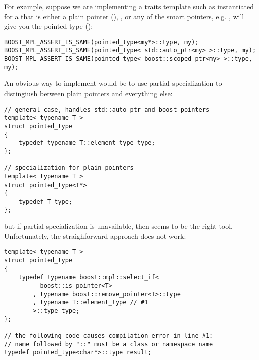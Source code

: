 \documentclass{netobjectdays}
\begin{document}

For example, suppose we are implementing a 
traits template such as  instantiated
for a  that is either a plain pointer
(), , or any of the 
smart pointers, e.g. , will give you 
the pointed type ():

{\footnotesize
\begin{verbatim}
BOOST_MPL_ASSERT_IS_SAME(pointed_type<my*>::type, my);
BOOST_MPL_ASSERT_IS_SAME(pointed_type< std::auto_ptr<my> >::type, my);
BOOST_MPL_ASSERT_IS_SAME(pointed_type< boost::scoped_ptr<my> >::type, my);
\end{verbatim}
}

An obvious way to implement  would be to 
use partial specialization to distingiush between plain 
pointers and everything else:

{\footnotesize
\begin{verbatim}
// general case, handles std::auto_ptr and boost pointers
template< typename T >
struct pointed_type
{
    typedef typename T::element_type type;
};

// specialization for plain pointers
template< typename T >
struct pointed_type<T*>
{
    typedef T type;
};
\end{verbatim}
}

but if partial specialization is unavailable, then 
 seems to be the right tool. Unfortunately,
the straighforward approach does not work:

{\footnotesize
\begin{verbatim}
template< typename T >
struct pointed_type
{
    typedef typename boost::mpl::select_if<
          boost::is_pointer<T>
        , typename boost::remove_pointer<T>::type
        , typename T::element_type // #1
        >::type type;
};

// the following code causes compilation error in line #1:
// name followed by "::" must be a class or namespace name
typedef pointed_type<char*>::type result;
\end{verbatim}
}
\end{document}
